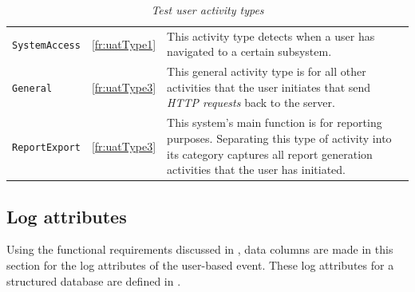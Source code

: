 \clearpage

\begin{table}[!htb]
	\centering
	\caption[Test user activity types]{\textit{Test user activity types}}
	\label{tbl:ch3_testActivityTypes}
	\begin{tabularx}{\textwidth}{llX}
		\toprule
		\thead{Activity} & \thead{Functional requirement} & \thead{Description} \\
		\midrule
		\rowcolor{lightgray}
		\texttt{SystemAccess} & \ref{fr:uatType1} & \RaggedRight This activity type detects when a user has navigated to a certain subsystem. \\ 
		\texttt{General} & \ref{fr:uatType3} & \RaggedRight This general activity type is for all other activities that the user initiates that send \textit{HTTP requests} back to the server. \\
		\rowcolor{lightgray}
		\texttt{ReportExport} & \ref{fr:uatType3} & \RaggedRight This system's main function is for reporting purposes. Separating this type of activity into its category captures all report generation activities that the user has initiated. \\ 
		\bottomrule
	\end{tabularx}
\end{table}

\subsection{Log attributes}\label{sec:ch3_implementationLogAtrributes}
Using the functional requirements discussed in , data columns are made in this section for the log attributes of the user-based event. These log attributes for a structured database are defined in . 

